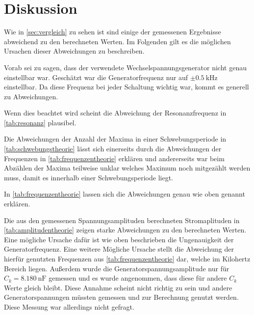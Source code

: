 \section{Diskussion}
\label{sec:Diskussion}


Wie in \autoref{sec:vergleich} zu sehen ist sind einige der gemessenen Ergebnisse abweichend zu den berechneten Werten. Im Folgenden gilt es die möglichen Ursachen dieser Abweichungen zu beschreiben.

Vorab sei zu sagen, dass der verwendete Wechselspannungsgenerator nicht genau einstellbar war. Geschätzt war die Generatorfrequenz nur auf $\pm \SI{0.5}{\kilo\hertz}$ einstellbar. 
Da diese Frequenz bei jeder Schaltung wichtig war, kommt es generell zu Abweichungen.

Wenn dies beachtet wird scheint die Abweichung der Resonanzfrequenz in \autoref{tab:resonanz} plausibel.

Die Abweichungen der Anzahl der Maxima in einer Schwebungsperiode in \autoref{tab:schwebungstheorie} lässt sich einerseits durch die Abweichungen der Frequenzen in \autoref{tab:frequenzentheorie} erklären und andererseits war beim Abzählen der Maxima teilweise unklar welches Maximum noch mitgezählt werden muss, damit es innerhalb einer Schwebungsperiode liegt.

In \autoref{tab:frequenzentheorie} lassen sich die Abweichungen genau wie oben genannt erklären.

Die aus den gemessenen Spannungsamplituden berechneten Stromaplituden in \autoref{tab:amplitudentheorie} zeigen starke Abweichungen zu den berechneten Werten.
Eine mögliche Ursache dafür ist wie oben beschrieben die Ungenauigkeit der Generatorfrequenz.
Eine weitere Mögliche Ursache stellt die Abweichung der hierfür genutzten Frequenzen aus \autoref{tab:frequenzentheorie} dar, welche im Kilohertz Bereich liegen.
Außerdem wurde die Generatorspannungsamplitude nur für $C_k = \SI{8.180}{\nano\farad}$ gemessen und es wurde angenommen, dass diese für andere $C_k$ Werte gleich bleibt. 
Diese Annahme scheint nicht richtig zu sein und andere Generatorspannungen müssten gemessen und zur Berechnung genutzt werden. Diese Messung war allerdings nicht gefragt.